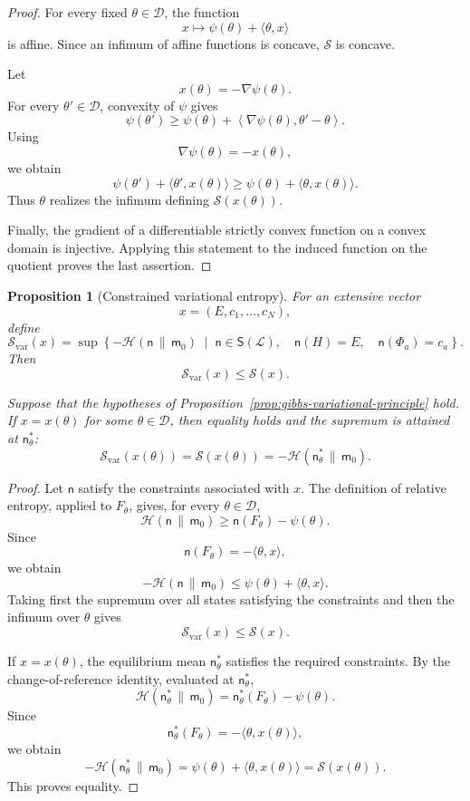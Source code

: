 \documentclass[11pt,reqno]{amsart}
\newtheorem{Proposition}[Theorem]{Proposition}
\begin{document}
\begin{proof}
For every fixed $\theta\in\mathcal D$, the function
\[
x\longmapsto
\psi(\theta)+\langle\theta,x\rangle
\]
is affine. Since an infimum of affine functions is concave,
$\mathcal S$ is concave.

Let
\[
x(\theta)=-\nabla\psi(\theta).
\]
For every $\theta'\in\mathcal D$, convexity of $\psi$ gives
\[
\psi(\theta')
\geq
\psi(\theta)
+
\left\langle
\nabla\psi(\theta),\theta'-\theta
\right\rangle.
\]
Using
\[
\nabla\psi(\theta)=-x(\theta),
\]
we obtain
\[
\psi(\theta')
+
\langle\theta',x(\theta)\rangle
\geq
\psi(\theta)
+
\langle\theta,x(\theta)\rangle.
\]
Thus $\theta$ realizes the infimum defining
$\mathcal S(x(\theta))$.

Finally, the gradient of a differentiable strictly convex function on a
convex domain is injective. Applying this statement to the induced
function on the quotient proves the last assertion.
\end{proof}

\begin{Proposition}[Constrained variational entropy]
\label{prop:constrained-entropy}
For an extensive vector
\[
x=(E,c_1,\ldots,c_N),
\]
define
\[
\mathcal S_{\mathrm{var}}(x)
=
\sup
\left\{
-\mathcal H(\mathsf n\,\|\,\mathsf m_0)
\;\middle|\;
\mathsf n\in\mathsf S(\mathcal L),
\quad
\mathsf n(H)=E,
\quad
\mathsf n(\Phi_a)=c_a
\right\}.
\]
Then
\[
\mathcal S_{\mathrm{var}}(x)
\leq
\mathcal S(x).
\]

Suppose that the hypotheses of
Proposition~\ref{prop:gibbs-variational-principle} hold. If
$x=x(\theta)$ for some $\theta\in\mathcal D$, then equality holds and
the supremum is attained at $\mathsf n_\theta^*$:
\[
\mathcal S_{\mathrm{var}}(x(\theta))
=
\mathcal S(x(\theta))
=
-\mathcal H(\mathsf n_\theta^*\,\|\,\mathsf m_0).
\]
\end{Proposition}

\begin{proof}
Let $\mathsf n$ satisfy the constraints associated with $x$. The
definition of relative entropy, applied to $F_\theta$, gives, for every
$\theta\in\mathcal D$,
\[
\mathcal H(\mathsf n\,\|\,\mathsf m_0)
\geq
\mathsf n(F_\theta)-\psi(\theta).
\]
Since
\[
\mathsf n(F_\theta)
=
-\langle\theta,x\rangle,
\]
we obtain
\[
-\mathcal H(\mathsf n\,\|\,\mathsf m_0)
\leq
\psi(\theta)+\langle\theta,x\rangle.
\]
Taking first the supremum over all states satisfying the constraints
and then the infimum over $\theta$ gives
\[
\mathcal S_{\mathrm{var}}(x)
\leq
\mathcal S(x).
\]

If $x=x(\theta)$, the equilibrium mean $\mathsf n_\theta^*$ satisfies
the required constraints. By the change-of-reference identity,
evaluated at $\mathsf n_\theta^*$,
\[
\mathcal H(\mathsf n_\theta^*\,\|\,\mathsf m_0)
=
\mathsf n_\theta^*(F_\theta)-\psi(\theta).
\]
Since
\[
\mathsf n_\theta^*(F_\theta)
=
-\langle\theta,x(\theta)\rangle,
\]
we obtain
\[
-\mathcal H(\mathsf n_\theta^*\,\|\,\mathsf m_0)
=
\psi(\theta)+\langle\theta,x(\theta)\rangle
=
\mathcal S(x(\theta)).
\]
This proves equality.
\end{proof}
\end{document}

